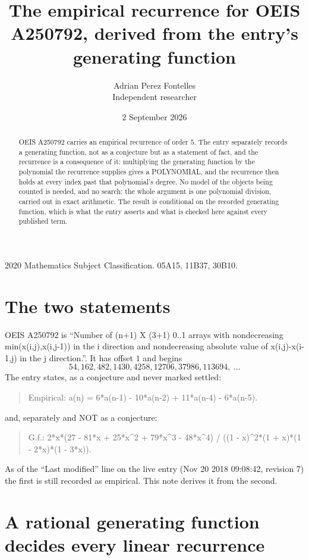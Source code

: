 \documentclass[11pt,a4paper]{article}
\title{The empirical recurrence for OEIS A250792, derived from the entry's generating function}
\author{Adrian Perez Fontelles\\ \small Independent researcher}
\date{2 September 2026}
\theoremstyle{plain}
\theoremstyle{definition}
\begin{document}
\maketitle

\begin{abstract}
OEIS A250792 carries an empirical recurrence of order $5$. The entry separately records a
generating function, not as a conjecture but as a statement of fact, and the recurrence is a
consequence of it: multiplying the generating function by the polynomial the recurrence
supplies gives a POLYNOMIAL, and the recurrence then holds at every index past that
polynomial's degree. No model of the objects being counted is needed, and no search: the
whole argument is one polynomial division, carried out in exact arithmetic. The result is
conditional on the recorded generating function, which is what the entry asserts and what is
checked here against every published term.
\end{abstract}

\noindent\small 2020 Mathematics Subject Classification. 05A15, 11B37, 30B10.\normalsize

\section{The two statements}

OEIS A250792 is ``Number of (n+1) X (3+1) 0..1 arrays with nondecreasing min(x(i,j),x(i,j-1)) in the i direction and nondecreasing absolute value of x(i,j)-x(i-1,j) in the j direction.''. It has offset $1$ and begins
\[
54, 162, 482, 1430, 4258, 12706, 37986, 113694,\ \dots
\]
The entry states, as a conjecture and never marked settled:
\begin{quote}
Empirical: a(n) = 6*a(n-1) - 10*a(n-2) + 11*a(n-4) - 6*a(n-5).
\end{quote}
and, separately and NOT as a conjecture:
\begin{quote}
G.f.: 2*x*(27 - 81*x + 25*x\^{}2 + 79*x\^{}3 - 48*x\^{}4) / ((1 - x)\^{}2*(1 + x)*(1 - 2*x)*(1 - 3*x)).
\end{quote}
As of the ``Last modified'' line on the live entry (Nov 20 2018 09:08:42, revision 7) the first is still
recorded as empirical. This note derives it from the second.

\section{A rational generating function decides every linear recurrence}
\end{document}
